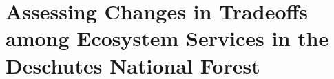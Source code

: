  
\chapter{Assessing Changes in Tradeoffs among Ecosystem Services in the Deschutes National Forest}




